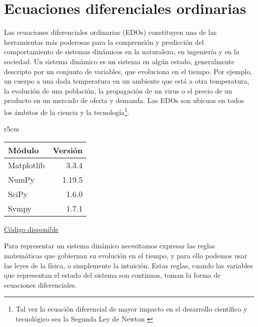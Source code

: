 

\chapter{Ecuaciones diferenciales ordinarias} \label{ch:ordinarias} 

Las ecuaciones diferenciales ordinarias (EDOs) constituyen una de las herramientas más poderosas para la comprensión y predicción del comportamiento de sistemas dinámicos en la naturaleza, en ingeniería y en la sociedad. Un sistema dinámico es un sistema en algún estado, generalmente descripto por un conjunto de variables, que evoluciona en el tiempo. Por ejemplo, un cuerpo a una dada temperatura en un ambiente que está a otra temperatura, la evolución de una población, la propagación de un virus o el precio de un producto en un mercado de oferta y demanda. Las EDOs son ubicuas en todos los ámbitos de la ciencia y la tecnología\footnote{Tal vez la ecuación diferencial de mayor impacto en el desarrollo científico y tecnológico sea la Segunda Ley de Newton \cite{feynman2011}}. 

\begin{wraptable}{r}{5cm}
\begin{modulesinfo}
\begin{center}
{\small
    \begin{tabular}{l r}
        \toprule
        \textbf{Módulo} & \textbf{Versión} \\
        \midrule
        Matplotlib & 3.3.4 \\
        NumPy & 1.19.5 \\
        SciPy & 1.6.0 \\
        Sympy & 1.7.1 \\
        \bottomrule
    \end{tabular}
    \vspace{0.75em}
    
    \href{https://github.com/facundobatista/libro-pyciencia/tree/master/código/ecuaciones_ordinarias/}{Código disponible}
}
\end{center}
\end{modulesinfo}
\end{wraptable}

Para representar un sistema dinámico necesitamos expresar las reglas matemáticas que gobiernan su evolución en el tiempo, y para ello podemos usar las leyes de la física, o simplemente la intuición. Estas reglas, cuando las variables que representan el estado del sistema son continuas, toman la forma de ecuaciones diferenciales.

